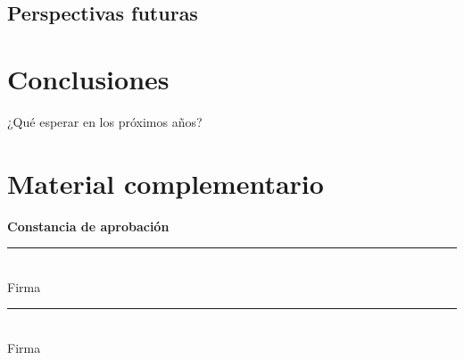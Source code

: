 \documentclass[12pt,a4paper]{report}
\begin{document}
\section{Perspectivas futuras}


\chapter{Conclusiones}

¿Qué esperar en los próximos años?

\printbibliography[heading=bibintoc,title={Bibliografía}]

\appendix
\chapter{Material complementario}

\clearpage
\thispagestyle{empty}
\vspace*{\fill}

\begin{center}
    \Large\textbf{Constancia de aprobación}
\end{center}

\vspace{1cm}


\vspace{3cm}

\noindent
\begin{minipage}{0.45\textwidth}
    \centering
    \rule{6cm}{0.4pt}\\
    Firma
\end{minipage}
\hfill
\begin{minipage}{0.45\textwidth}
    \centering
    \rule{6cm}{0.4pt}\\
    Firma
\end{minipage}

\vspace*{\fill}
\end{document}
